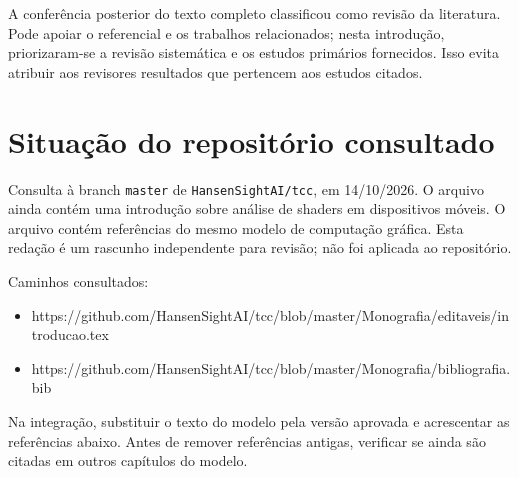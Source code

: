 A conferência posterior do texto completo classificou  como revisão da literatura. Pode apoiar o referencial e os trabalhos
relacionados; nesta introdução, priorizaram-se a revisão sistemática  e os estudos primários fornecidos. Isso evita atribuir aos
revisores resultados que pertencem aos estudos citados.

\section{Situação do repositório
consultado}\label{situauxe7uxe3o-do-reposituxf3rio-consultado}

Consulta à branch \texttt{master} de \texttt{HansenSightAI/tcc}, em
14/10/2026. O arquivo  ainda
contém uma introdução sobre análise de shaders em dispositivos móveis. O
arquivo  contém referências do mesmo
modelo de computação gráfica. Esta redação é um rascunho independente
para revisão; não foi aplicada ao repositório.

Caminhos consultados:

\begin{itemize}
\tightlist
\item
  https://github.com/HansenSightAI/tcc/blob/master/Monografia/editaveis/introducao.tex
\item
  https://github.com/HansenSightAI/tcc/blob/master/Monografia/bibliografia.bib
\end{itemize}

Na integração, substituir o texto do modelo pela versão aprovada e
acrescentar as referências abaixo. Antes de remover referências antigas,
verificar se ainda são citadas em outros capítulos do modelo.



